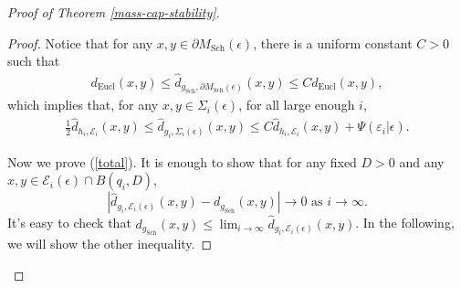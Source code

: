 \documentclass[letter]{amsart}
\theoremstyle{definition}
\theoremstyle{remark}
\begin{document}
\begin{proof}[Proof of Theorem \ref{mass-cap-stability}]
\begin{proof}
	Notice that for any $x, y \in \partial M_{\mathrm{Sch}}(\epsilon )$, there is a uniform constant $C>0$ such that 
	\begin{align*}
		d_{\mathrm{Eucl}}(x,y) \leq \hat{d}_{g_{\mathrm{Sch}}, \partial M_{\mathrm{Sch}}(\epsilon )}(x, y) \leq C d_{\mathrm{Eucl}}(x,y),
	\end{align*}
	which implies that, for any $x, y \in \Sigma _i(\epsilon )$, for all large enough $i$,
	\begin{align}\label{bd-vs-total}
		\frac{1}{2}\hat{d}_{h_i, \mathcal{E}_i}(x,y) \leq \hat{d}_{g_i, \Sigma _i(\epsilon )}(x,y) \leq C\hat{d}_{h_i, \mathcal{E}_i}(x,y)+ \Psi (\varepsilon _i|\epsilon ).
	\end{align}

	Now we prove (\ref{total}). It is enough to show that for any fixed $D>0$ and any $x, y \in \mathcal{E}_i(\epsilon ) \cap B(q_i, D)$, 
	$$|\hat{d}_{g_i, \mathcal{E}_i(\epsilon )}(x,y) - d_{g_{\mathrm{Sch}}}(x,y) | \to 0 \text{ as } i\to \infty. $$
	It's easy to check that $d_{g_{\mathrm{Sch}}}(x,y) \leq \lim_{i\to \infty} \hat{d}_{g_i, \mathcal{E}_i(\epsilon )}(x,y)$. In the following, we will show the other inequality.
	

\end{proof}
\end{proof}
\end{document}
